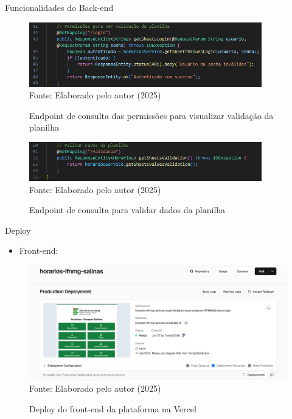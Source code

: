 \begin{frame}{Funcionalidades do Back-end}
    \begin{figure}
        \centering
        \vspace{-0.3cm}
        \caption{Endpoint de consulta das permissões para visualizar validação da planilha}
        \vspace{-0.2cm}
        \includegraphics[width=0.9\textwidth]{figuras/back-7.png}
        \\ %
        \footnotesize Fonte: Elaborado pelo autor (2025)
    \end{figure}
    \begin{figure}
        \centering
        \vspace{-0.5cm}
        \caption{Endpoint de consulta para validar dados da planilha}
        \vspace{-0.2cm}
        \includegraphics[width=0.9\textwidth]{figuras/back-8.png}
        \\ %
        \footnotesize Fonte: Elaborado pelo autor (2025)
    \end{figure}
\end{frame}

\begin{frame}{Deploy}
    \begin{itemize}
        \item Front-end:
    \end{itemize}
    \begin{figure}
        \centering
        \vspace{-0.3cm}
        \caption{Deploy do front-end da plataforma na Vercel}
        \vspace{-0.2cm}
        \includegraphics[width=1\textwidth]{figuras/deploy-1.png}
        \\ %
        \footnotesize Fonte: Elaborado pelo autor (2025)
    \end{figure}
\end{frame}


